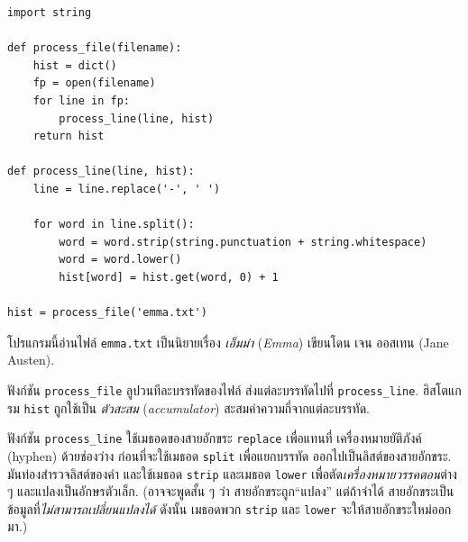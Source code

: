 \begin{verbatim}
import string

def process_file(filename):
    hist = dict()
    fp = open(filename)
    for line in fp:
        process_line(line, hist)
    return hist

def process_line(line, hist):
    line = line.replace('-', ' ')
    
    for word in line.split():
        word = word.strip(string.punctuation + string.whitespace)
        word = word.lower()
        hist[word] = hist.get(word, 0) + 1

hist = process_file('emma.txt')
\end{verbatim}
%
%
โปรแกรมนี้อ่านไฟล์ {\tt emma.txt}
เป็นนิยายเรื่อง \textit{เอ็มม่า} (\textit{Emma}) เขียนโดน เจน ออสเทน (Jane Austen).


ฟังก์ชัน \verb|process_file| ลูปวนทีละบรรทัดของไฟล์ 
ส่งแต่ละบรรทัดไปที่ \verb|process_line|.
ฮิสโตแกรม \texttt{hist} ถูกใช้เป็น \textit{ตัวสะสม} (\textit{accumulator}) สะสมค่าความถี่จากแต่ละบรรทัด.


ฟังก์ชัน \verb|process_line| ใช้เมธอดของสายอักขระ \texttt{replace}
เพื่อแทนที่ เครื่องหมายยัติภังค์ (hyphen) ด้วยช่องว่าง
ก่อนที่จะใช้เมธอด \texttt{split} เพื่อแยกบรรทัด ออกไปเป็นลิสต์ของสายอักขระ.
มันท่องสำรวจลิสต์ของคำ และใช้เมธอด \texttt{strip} และเมธอด \texttt{lower}
เพื่อตัด\textit{เครื่องหมายวรรคตอน}ต่าง ๆ และแปลงเป็นอักษรตัวเล็ก.
(อาจจะพูดสั้น ๆ ว่า สายอักขระถูก``แปลง'' 
แต่ถ้าจำได้ สายอักขระเป็นข้อมูลที่\textit{ไม่สามารถเปลี่ยนแปลงได้}
ดังนั้น เมธอดพวก \texttt{strip} และ \texttt{lower} จะให้สายอักขระใหม่ออกมา.)


